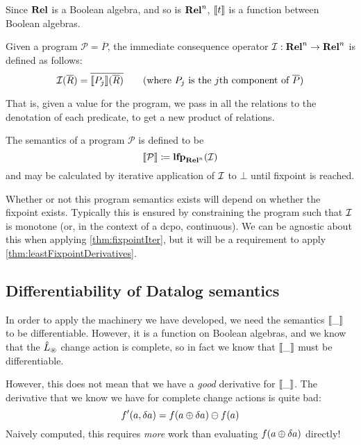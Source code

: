Since $\mathbf{Rel}$ is a Boolean algebra, and so is $\mathbf{Rel}^n$, $\llbracket t \rrbracket$ is a function between Boolean algebras.

\begin{defn}
  Given a program $\mathcal{P} = \overline{P}$, the immediate consequence operator $\mathcal{I}: \mathbf{Rel}^n \rightarrow \mathbf{Rel}^n$ is defined as follows:
  \begin{displaymath}
    \consq(\overline{R}) = \overline{\denote{P_j}(\overline{R})} \tag{where $P_j$ is the $j$th component of $\overline{P}$}
  \end{displaymath}
\end{defn}

That is, given a value for the program, we pass in all the relations
to the denotation of each predicate, to get a new product of relations.

\begin{defn}
  The semantics of a program $\mathcal{P}$ is defined to be
  \begin{displaymath}
    \llbracket \mathcal{P} \rrbracket \coloneqq \mathbf{lfp}_{\mathbf{Rel}^n}(\mathcal{I})
  \end{displaymath}
  and may be calculated by iterative application of $\mathcal{I}$ to $\bot$ until
  fixpoint is reached.
\end{defn}

Whether or not this program semantics exists will depend on whether the fixpoint
exists. Typically this is ensured by constraining the program such that $\mathcal{I}$
is monotone (or, in the context of a dcpo, continuous). We can be agnostic
about this when applying \cref{thm:fixpointIter}, but it will be a requirement to
apply \cref{thm:leastFixpointDerivatives}.

\subsection{Differentiability of Datalog semantics}
\label{sec:datalogDifferentiability}

In order to apply the machinery we have developed, we need the semantics $\llbracket \_ \rrbracket$ to
be differentiable. However, it is a function on Boolean algebras, and we know
that the $\hat{L}_\circledast$ change action is complete, so in fact we know that
$\llbracket \_ \rrbracket$ must be differentiable.

However, this does not mean that we have a \emph{good} derivative for
$\llbracket \_ \rrbracket$. The derivative that we know we have for complete change actions
is quite bad:
\begin{displaymath}
  f'(a, \delta a) = f(a \oplus \delta a) \ominus f(a)
\end{displaymath}
Naively computed, this requires \emph{more} work than evaluating $f(a \oplus \delta a)$ directly!

